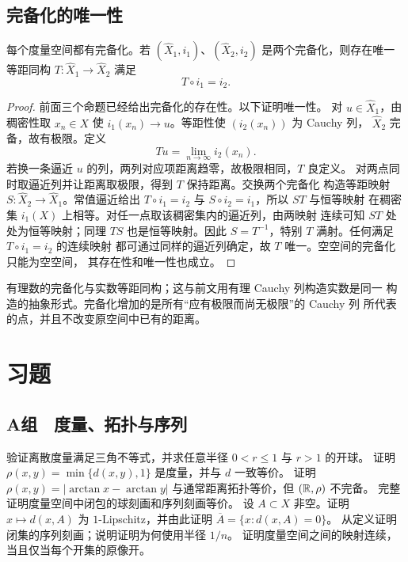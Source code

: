 \subsection{完备化的唯一性}

\begin{theorem}[度量空间的完备化]
\label{thm:metric-completion-existence-uniqueness}
每个度量空间都有完备化。若
\((\widehat X_1,i_1)\)、\((\widehat X_2,i_2)\) 是两个完备化，则存在唯一
等距同构 \(T:\widehat X_1\to\widehat X_2\) 满足
\[
 T\circ i_1=i_2.
\]
\end{theorem}

\begin{proof}
前面三个命题已经给出完备化的存在性。以下证明唯一性。
对 \(u\in\widehat X_1\)，由稠密性取 \(x_n\in X\) 使
\(i_1(x_n)\to u\)。等距性使 \((i_2(x_n))\) 为 Cauchy 列，
\(\widehat X_2\) 完备，故有极限。定义
\[
 Tu=\lim_{n\to\infty}i_2(x_n).
\]
若换一条逼近 \(u\) 的列，两列对应项距离趋零，故极限相同，\(T\) 良定义。
对两点同时取逼近列并让距离取极限，得到 \(T\) 保持距离。交换两个完备化
构造等距映射 \(S:\widehat X_2\to\widehat X_1\)。常值逼近给出
\(T\circ i_1=i_2\) 与 \(S\circ i_2=i_1\)，所以 \(ST\) 与恒等映射
在稠密集 \(i_1(X)\) 上相等。对任一点取该稠密集内的逼近列，由两映射
连续可知 \(ST\) 处处为恒等映射；同理 \(TS\) 也是恒等映射。因此
\(S=T^{-1}\)，特别 \(T\) 满射。任何满足 \(T\circ i_1=i_2\) 的连续映射
都可通过同样的逼近列确定，故 \(T\) 唯一。空空间的完备化只能为空空间，
其存在性和唯一性也成立。
\end{proof}

有理数的完备化与实数等距同构；这与前文用有理 Cauchy 列构造实数是同一
构造的抽象形式。完备化增加的是所有“应有极限而尚无极限”的 Cauchy 列
所代表的点，并且不改变原空间中已有的距离。

\section*{习题}

\subsection*{A组　度量、拓扑与序列}
\begin{enumerate}[label=\textbf{\thechapter.\arabic*.}]
 验证离散度量满足三角不等式，并求任意半径 \(0<r\le1\) 与 \(r>1\) 的开球。
 证明 \(\rho(x,y)=\min\{d(x,y),1\}\) 是度量，并与 \(d\) 一致等价。
 证明 \(\rho(x,y)=|\arctan x-\arctan y|\) 与通常距离拓扑等价，但
 \((\mathbb{R},\rho)\) 不完备。
 完整证明度量空间中闭包的球刻画和序列刻画等价。
 设 \(A\subset X\) 非空。证明 \(x\mapsto d(x,A)\) 为 \(1\)-Lipschitz，并由此证明
 \(\overline A=\{x:d(x,A)=0\}\)。
 从定义证明闭集的序列刻画；说明证明为何使用半径 \(1/n\)。
 证明度量空间之间的映射连续，当且仅当每个开集的原像开。
\end{enumerate}


